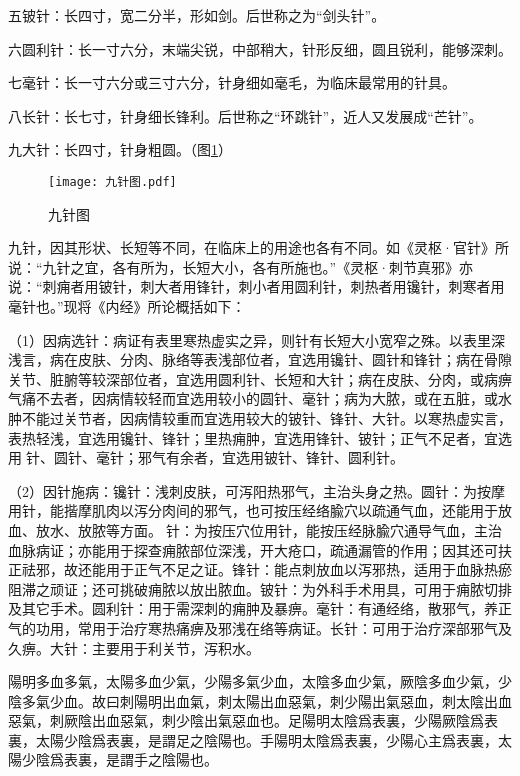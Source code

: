 \documentclass[12pt]{ctexbook}%
\begin{document}
五铍针：长四寸，宽二分半，形如剑。后世称之为“剑头针”。

六圆利针：长一寸六分，末端尖锐，中部稍大，针形反细，圆且锐利，能够深刺。

七毫针：长一寸六分或三寸六分，针身细如毫毛，为临床最常用的针具。

八长针：长七寸，针身细长锋利。后世称之“环跳针”，近人又发展成“芒针”。

九大针：长四寸，针身粗圆。（图\ref{fig:九针图}）

\begin{figure}[htb]
	\centering
	\texttt{[image: 九针图.pdf]}\\
	\caption{九针图}\label{fig:九针图}
\end{figure}



九针，因其形状、长短等不同，在临床上的用途也各有不同。如《灵枢·官针》所说：“九针之宜，各有所为，长短大小，各有所施也。”《灵枢·刺节真邪》亦说：“刺痈者用铍针，刺大者用锋针，刺小者用圆利针，刺热者用镵针，刺寒者用毫针也。”现将《内经》所论概括如下：

（1）因病选针：病证有表里寒热虚实之异，则针有长短大小宽窄之殊。以表里深浅言，病在皮肤、分肉、脉络等表浅部位者，宜选用镵针、圆针和锋针；病在骨隙关节、脏腑等较深部位者，宜选用圆利针、长短和大针；病在皮肤、分肉，或病痹气痛不去者，因病情较轻而宜选用较小的圆针、毫针；病为大脓，或在五脏，或水肿不能过关节者，因病情较重而宜选用较大的铍针、锋针、大针。以寒热虚实言，表热轻浅，宜选用镵针、锋针；里热痈肿，宜选用锋针、铍针；正气不足者，宜选用𫔂针、圆针、毫针；邪气有余者，宜选用铍针、锋针、圆利针。

（2）因针施病：镵针：浅刺皮肤，可泻阳热邪气，主治头身之热。圆针：为按摩用针，能揩摩肌肉以泻分肉间的邪气，也可按压经络腧穴以疏通气血，还能用于放血、放水、放脓等方面。𫔂针：为按压穴位用针，能按压经脉腧穴通导气血，主治血脉病证；亦能用于探查痈脓部位深浅，开大疮口，疏通漏管的作用；因其还可扶正祛邪，故还能用于正气不足之证。锋针：能点刺放血以泻邪热，适用于血脉热瘀阻滞之顽证；还可挑破痈脓以放出脓血。铍针：为外科手术用具，可用于痈脓切排及其它手术。圆利针：用于需深刺的痈肿及暴痹。毫针：有通经络，散邪气，养正气的功用，常用于治疗寒热痛痹及邪浅在络等病证。长针：可用于治疗深部邪气及久痹。大针：主要用于利关节，泻积水。


\begin{yuanwen}
陽明多血多氣，太陽多血少氣，少陽多氣少血，太陰多血少氣，厥陰多血少氣，少陰多氣少血。故曰刺陽明出血氣，刺太陽出血惡氣，刺少陽出氣惡血，刺太陰出血惡氣，刺厥陰出血惡氣，刺少陰出氣惡血也。足陽明太陰爲表裏，少陽厥陰爲表裏，太陽少陰爲表裏，是謂足之陰陽也。手陽明太陰爲表裏，少陽心主爲表裏，太陽少陰爲表裏，是謂手之陰陽也。
\end{yuanwen}
\end{document}
